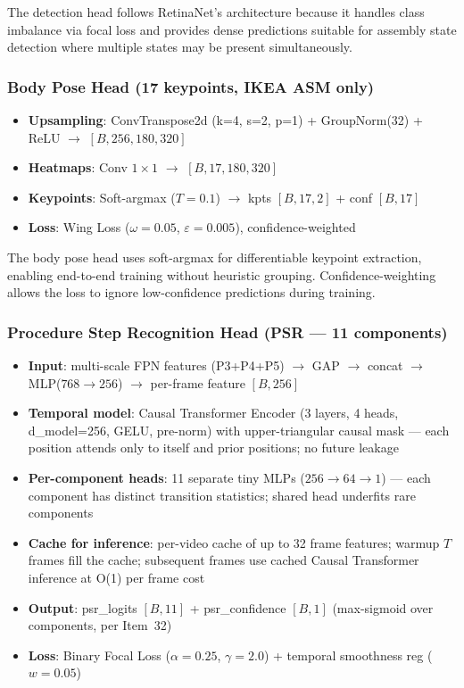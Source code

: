 \documentclass[11pt,a4paper]{article}
\begin{document}
The detection head follows RetinaNet's architecture because it handles class imbalance via focal loss and provides dense predictions suitable for assembly state detection where multiple states may be present simultaneously.

\subsubsection{Body Pose Head (17 keypoints, IKEA ASM only)}
\begin{itemize}
\item \textbf{Upsampling}: ConvTranspose2d (k=4, s=2, p=1) + GroupNorm(32) + ReLU $\rightarrow$ $[B, 256, 180, 320]$
\item \textbf{Heatmaps}: Conv $1\times1$ $\rightarrow$ $[B, 17, 180, 320]$
\item \textbf{Keypoints}: Soft-argmax ($T=0.1$) $\rightarrow$ kpts $[B, 17, 2]$ + conf $[B, 17]$
\item \textbf{Loss}: Wing Loss ($\omega=0.05$, $\varepsilon=0.005$), confidence-weighted
\end{itemize}

The body pose head uses soft-argmax for differentiable keypoint extraction, enabling end-to-end training without heuristic grouping. Confidence-weighting allows the loss to ignore low-confidence predictions during training.

\subsubsection{Procedure Step Recognition Head (PSR --- 11 components)}
\begin{itemize}
\item \textbf{Input}: multi-scale FPN features (P3+P4+P5) $\rightarrow$ GAP $\rightarrow$ concat $\rightarrow$ MLP($768 \rightarrow 256$) $\rightarrow$ per-frame feature $[B, 256]$
\item \textbf{Temporal model}: Causal Transformer Encoder (3 layers, 4 heads, d\_model=256, GELU, pre-norm) with upper-triangular causal mask --- each position attends only to itself and prior positions; no future leakage
\item \textbf{Per-component heads}: 11 separate tiny MLPs ($256 \rightarrow 64 \rightarrow 1$) --- each component has distinct transition statistics; shared head underfits rare components
\item \textbf{Cache for inference}: per-video cache of up to 32 frame features; warmup $T$ frames fill the cache; subsequent frames use cached Causal Transformer inference at O(1) per frame cost
\item \textbf{Output}: psr\_logits $[B, 11]$ + psr\_confidence $[B, 1]$ (max-sigmoid over components, per Item~32)
\item \textbf{Loss}: Binary Focal Loss ($\alpha=0.25$, $\gamma=2.0$) + temporal smoothness reg ($w=0.05$)
\end{itemize}
\end{document}
